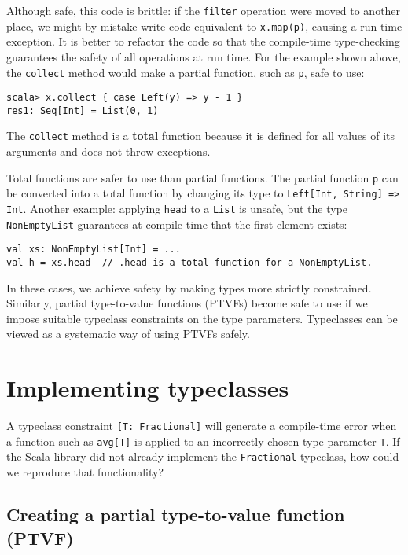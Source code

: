 Although safe, this code is brittle: if the \lstinline!filter! operation
were moved to another place, we might by mistake write code equivalent
to \lstinline!x.map(p)!, causing a run-time exception. It is better
to refactor the code so that the compile-time type-checking guarantees
the safety of all operations at run time. For the example shown above,
the \lstinline!collect! method would make a partial function, such
as \lstinline!p!, safe to use:
\begin{lstlisting}
scala> x.collect { case Left(y) => y - 1 }
res1: Seq[Int] = List(0, 1)
\end{lstlisting}
The \lstinline!collect! method is a \textbf{total}
function because it is defined for all values of its arguments and
does not throw exceptions. 

Total functions are safer to use than partial functions. The partial
function \lstinline!p! can be converted into a total function by
changing its type to \lstinline!Left[Int, String] => Int!. Another
example: applying \lstinline!head! to a \lstinline!List! is unsafe,
but the type \lstinline!NonEmptyList! guarantees at compile time
that the first element exists:
\begin{lstlisting}
val xs: NonEmptyList[Int] = ...
val h = xs.head  // .head is a total function for a NonEmptyList.
\end{lstlisting}
In these cases, we achieve safety by making types more strictly constrained.
Similarly, partial type-to-value functions (PTVFs) become safe to
use if we impose suitable typeclass constraints on the type parameters.
Typeclasses can be viewed as a systematic way of using PTVFs safely.

\section{Implementing typeclasses}

A typeclass constraint \lstinline![T: Fractional]! will generate
a compile-time error when a function such as \lstinline!avg[T]! is
applied to an incorrectly chosen type parameter \lstinline!T!. If
the Scala library did not already implement the \lstinline!Fractional!
typeclass, how could we reproduce that functionality?

\subsection{Creating a partial type-to-value function (PTVF)}

